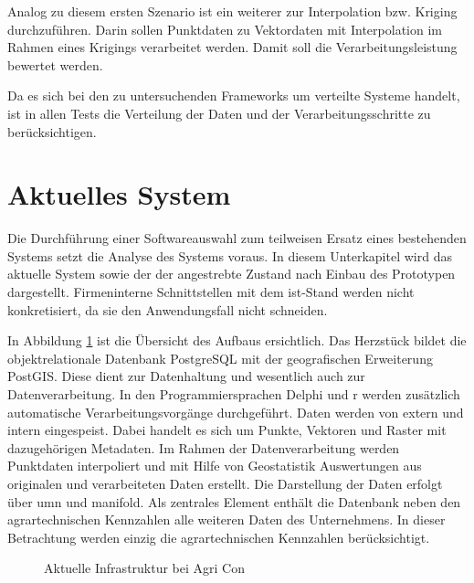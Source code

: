 Analog zu diesem ersten Szenario ist ein weiterer zur Interpolation bzw. Kriging durchzuführen.
Darin sollen Punktdaten zu Vektordaten mit Interpolation im Rahmen eines Krigings verarbeitet werden.
Damit soll die Verarbeitungsleistung bewertet werden.


Da es sich bei den zu untersuchenden Frameworks um verteilte Systeme handelt, ist in allen Tests die Verteilung der Daten und der Verarbeitungsschritte zu berücksichtigen.


\section{Aktuelles System}
\label{IstStand}

Die Durchführung einer Softwareauswahl zum teilweisen Ersatz eines bestehenden Systems setzt die Analyse des Systems voraus.
In diesem Unterkapitel wird das aktuelle System sowie der der angestrebte Zustand nach Einbau des Prototypen dargestellt.
Firmeninterne Schnittstellen mit dem ist-Stand werden nicht konkretisiert, da sie den Anwendungsfall nicht schneiden.

In Abbildung \ref{fig:iststand} ist die Übersicht des Aufbaus ersichtlich.
Das Herzstück bildet die objektrelationale Datenbank PostgreSQL mit der geografischen Erweiterung PostGIS.
Diese dient zur Datenhaltung und wesentlich auch zur Datenverarbeitung.
In den Programmiersprachen Delphi und \Gls{r} werden zusätzlich automatische Verarbeitungsvorgänge durchgeführt.
Daten werden von extern und intern eingespeist.
Dabei handelt es sich um Punkte, Vektoren und Raster mit dazugehörigen Metadaten.
Im Rahmen der Datenverarbeitung werden Punktdaten interpoliert und mit Hilfe von Geostatistik Auswertungen aus originalen und verarbeiteten Daten erstellt.
Die Darstellung der Daten erfolgt über \Gls{umn} und \Gls{manifold}.
Als zentrales Element enthält die Datenbank neben den agrartechnischen Kennzahlen alle weiteren Daten des Unternehmens. In dieser Betrachtung werden einzig die agrartechnischen Kennzahlen berücksichtigt.
\begin{figure}[h]
\centering

\caption[Aktuelle Infrastruktur bei Agri Con]{Aktuelle Infrastruktur bei Agri Con}
\label{fig:iststand}
\end{figure}
%
\label{iststand-vorgaenge}


